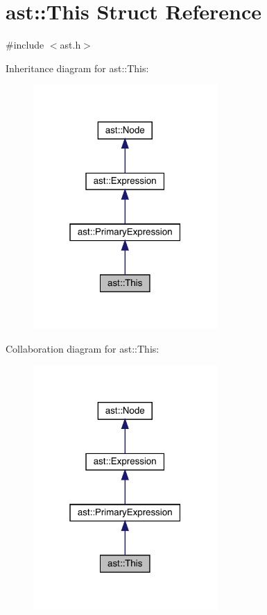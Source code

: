 \hypertarget{structast_1_1_this}{}\section{ast\+:\+:This Struct Reference}
\label{structast_1_1_this}


{\ttfamily \#include $<$ast.\+h$>$}



Inheritance diagram for ast\+:\+:This\+:
\nopagebreak
\begin{figure}[H]
\begin{center}
\leavevmode
\includegraphics[width=199pt]{structast_1_1_this__inherit__graph}
\end{center}
\end{figure}


Collaboration diagram for ast\+:\+:This\+:
\nopagebreak
\begin{figure}[H]
\begin{center}
\leavevmode
\includegraphics[width=199pt]{structast_1_1_this__coll__graph}
\end{center}
\end{figure}
